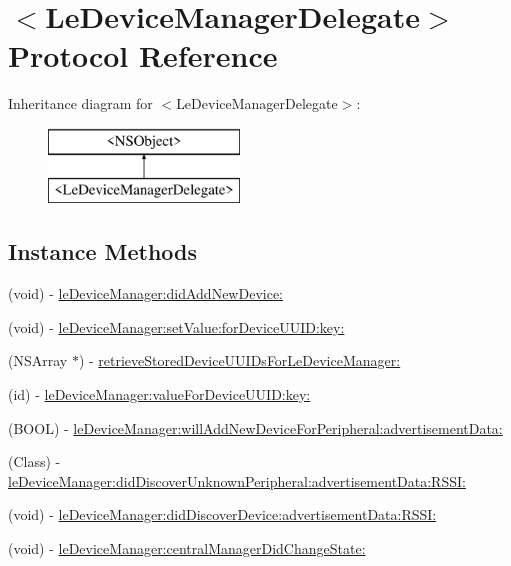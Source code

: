 \hypertarget{protocol_le_device_manager_delegate-p}{}\section{$<$Le\+Device\+Manager\+Delegate$>$ Protocol Reference}
\label{protocol_le_device_manager_delegate-p}
Inheritance diagram for $<$Le\+Device\+Manager\+Delegate$>$\+:\begin{figure}[H]
\begin{center}
\leavevmode
\includegraphics[height=2.000000cm]{protocol_le_device_manager_delegate-p}
\end{center}
\end{figure}
\subsection*{Instance Methods}
\begin{DoxyCompactItemize}
\item 
(void) -\/ \hyperlink{protocol_le_device_manager_delegate-p_a70db1bc2a4ce609c765ae519401d1427}{le\+Device\+Manager\+:did\+Add\+New\+Device\+:}
\item 
(void) -\/ \hyperlink{protocol_le_device_manager_delegate-p_afa9c0da81490f05e3d731b894334b5d7}{le\+Device\+Manager\+:set\+Value\+:for\+Device\+U\+U\+I\+D\+:key\+:}
\item 
(N\+S\+Array $\ast$) -\/ \hyperlink{protocol_le_device_manager_delegate-p_a6498142b98177f629ad9cbdd97f4036b}{retrieve\+Stored\+Device\+U\+U\+I\+Ds\+For\+Le\+Device\+Manager\+:}
\item 
(id) -\/ \hyperlink{protocol_le_device_manager_delegate-p_adad854dfca7660d5c97969c9fd62531f}{le\+Device\+Manager\+:value\+For\+Device\+U\+U\+I\+D\+:key\+:}
\item 
(B\+O\+O\+L) -\/ \hyperlink{protocol_le_device_manager_delegate-p_a70f1349287ebda8fa3d212730f7a1286}{le\+Device\+Manager\+:will\+Add\+New\+Device\+For\+Peripheral\+:advertisement\+Data\+:}
\item 
(Class) -\/ \hyperlink{protocol_le_device_manager_delegate-p_a3794cb5995e3f06aceacfa93a40215c5}{le\+Device\+Manager\+:did\+Discover\+Unknown\+Peripheral\+:advertisement\+Data\+:\+R\+S\+S\+I\+:}
\item 
(void) -\/ \hyperlink{protocol_le_device_manager_delegate-p_a5df86897aece02a0b211ddab6d844021}{le\+Device\+Manager\+:did\+Discover\+Device\+:advertisement\+Data\+:\+R\+S\+S\+I\+:}
\item 
(void) -\/ \hyperlink{protocol_le_device_manager_delegate-p_a7111555a9dbd844c7e2720acf40380fc}{le\+Device\+Manager\+:central\+Manager\+Did\+Change\+State\+:}
\end{DoxyCompactItemize}


